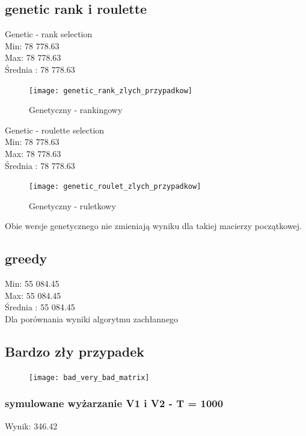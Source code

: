 \documentclass{article}
\begin{document}
\subsection{genetic rank i roulette}

Genetic - rank selection\\
Min: 78 778.63\\
Max: 78 778.63\\
Średnia : 78 778.63\\

\begin{figure}[H]
	\centering
	\texttt{[image: genetic\_rank\_zlych\_przypadkow]}
	\caption{Genetyczny - rankingowy}
	\label{fig:geneticrankzlychprzypadkow}
\end{figure}


Genetic - roulette selection\\
Min: 78 778.63\\
Max: 78 778.63\\
Średnia : 78 778.63\\

\begin{figure}[H]
	\centering
	\texttt{[image: genetic\_roulet\_zlych\_przypadkow]}
	\caption{Genetyczny - ruletkowy}
	\label{fig:geneticrouletzlychprzypadkow}
\end{figure}

Obie wersje genetycznego nie zmieniają wyniku dla takiej macierzy początkowej.


\subsection{greedy}

Min: 55 084.45\\
Max: 55 084.45\\
Średnia : 55 084.45\\

Dla porównania wyniki algorytmu zachłannego


\subsection{Bardzo zły przypadek}

\begin{figure}[H]
	\centering
	\texttt{[image: bad\_very\_bad\_matrix]}
	\caption{}
	\label{fig:badverybadmatrix}
\end{figure}

\subsubsection{symulowane wyżarzanie V1 i V2  - T = 1000}
Wynik: 346.42
\end{document}
